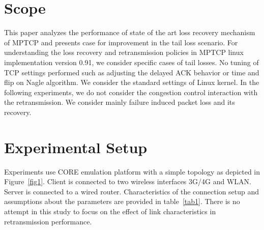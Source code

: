 \documentclass[10pt,draftcls,twocolumn]{IEEEconf}
\begin{document}
\section{Scope}\label{scope}

This paper analyzes the performance of state of the art loss recovery mechanism of MPTCP and presents case for improvement in the tail loss scenario. 
For understanding the loss recovery and retransmission policies in MPTCP linux implementation version 0.91, we consider specific cases of tail losses.  
No tuning of TCP settings performed such as adjusting the delayed ACK behavior or time and flip on Nagle algorithm. We consider the standard settings
of Linux kernel. In the following experiments, we do not consider the congestion control interaction with the retransmission. We consider mainly failure
induced packet loss and its recovery.

\section{Experimental Setup}\label{exsetup}

Experiments use CORE emulation platform with a simple topology as depicted in Figure~\ref{fig1}.
Client is connected to two wireless interfaces 3G/4G and WLAN. Server is connected to a wired router.
Characteristics of the connection setup and assumptions about the parameters are provided in table~\ref{tab1}.
There is no attempt in this study to focus on the effect of link characteristics in retransmission performance.
 
\end{document}
